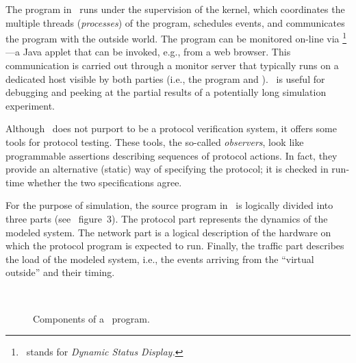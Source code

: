 The program in \smurph\ runs under the supervision of the {\smurph}
kernel, which coordinates the multiple
threads ({\em processes\/}) of the program, schedules events, and
communicates the program with the outside world.
The program can be monitored on-line via \dsd\footnote{\dsd\ stands for
{\em Dynamic Status Display.}}---a Java applet that
can be invoked, e.g., from a web browser.
This communication is carried out through a monitor server that typically
runs on a dedicated host visible by both parties (i.e., the program
and \dsd).
\dsd\ is useful for debugging and peeking at the partial
results of a potentially long simulation experiment.


Although \smurph\ does not purport to be a protocol verification system,
it offers some tools for protocol testing.
These tools, the so-called {\em observers}, look like programmable
assertions describing sequences of protocol actions.
In fact, they provide an alternative (static) way of specifying the protocol;
it is checked in run-time whether the two specifications agree.

For the purpose of simulation, the source program in \smurph\ is logically
divided into three parts (see~
figure~3).
The protocol part represents the dynamics of the modeled system.
The network part is a logical description of the hardware on which the
protocol program is expected to run.
Finally, the traffic part describes the load of the modeled
system, i.e., the events arriving from the ``virtual outside'' and their
timing.

\begin{figure}[htbp]%
\begin{center}
\ 
\caption{Components of a \smurph\ program.}%
\end{center}
\end{figure}%


